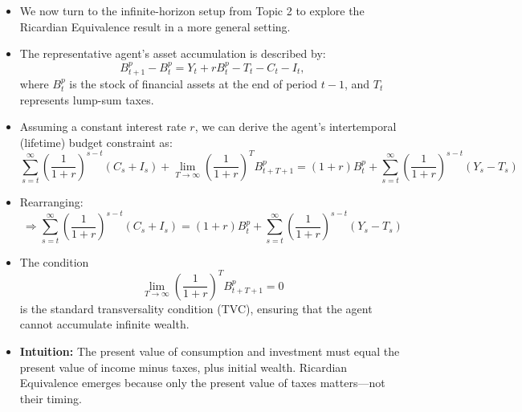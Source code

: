 \documentclass[12pt]{article}
\begin{document}
\begin{itemize}
\item We now turn to the infinite-horizon setup from Topic 2 to explore the Ricardian Equivalence result in a more general setting.

\item The representative agent’s asset accumulation is described by:
\[
B^p_{t+1} - B^p_t = Y_t + r B^p_t - T_t - C_t - I_t,
\]
where $B^p_t$ is the stock of financial assets at the end of period $t - 1$, and $T_t$ represents lump-sum taxes.

\item Assuming a constant interest rate $r$, we can derive the agent’s intertemporal (lifetime) budget constraint as:
\[
\sum_{s=t}^{\infty} \left( \frac{1}{1 + r} \right)^{s - t} (C_s + I_s) + \lim_{T \to \infty} \left( \frac{1}{1 + r} \right)^T B^p_{t+T+1}
= (1 + r) B^p_t + \sum_{s=t}^{\infty} \left( \frac{1}{1 + r} \right)^{s - t} (Y_s - T_s)
\]

\item Rearranging:
\[
\Rightarrow \sum_{s=t}^{\infty} \left( \frac{1}{1 + r} \right)^{s - t} (C_s + I_s)
= (1 + r) B^p_t + \sum_{s=t}^{\infty} \left( \frac{1}{1 + r} \right)^{s - t} (Y_s - T_s)
\]

\item The condition
\[
\lim_{T \to \infty} \left( \frac{1}{1 + r} \right)^T B^p_{t+T+1} = 0
\]
is the standard transversality condition (TVC), ensuring that the agent cannot accumulate infinite wealth.

\item \textbf{Intuition:} The present value of consumption and investment must equal the present value of income minus taxes, plus initial wealth. Ricardian Equivalence emerges because only the present value of taxes matters—not their timing.
\end{itemize}
\end{document}
